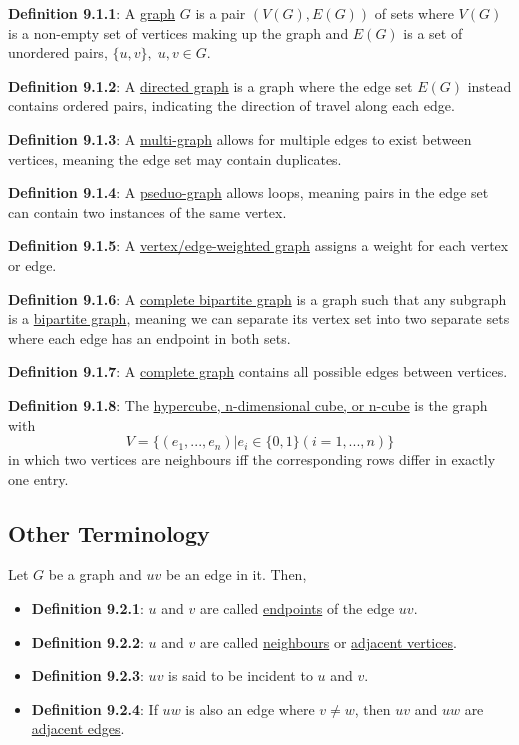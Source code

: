 \documentclass{article}
\newcommand{\separate}[1] {\vspace{#1 pt}\noindent}
\newcommand{\definition}[2]{\textbf{Definition #1}: #2\label{def:#1}}
\begin{document}
\definition{9.1.1}{A \underline{graph} \(G\) is a pair \((V(G), E(G))\) of sets where \(V(G)\) is a non-empty set of vertices making up the graph and \(E(G)\) is a set of unordered pairs, \(\{u,v\}, \;u,v\in G\).}

\separate{5}\definition{9.1.2}{A \underline{directed graph} is a graph where the edge set \(E(G)\) instead contains ordered pairs, indicating the direction of travel along each edge.}

\separate{5}\definition{9.1.3}{A \underline{multi-graph} allows for multiple edges to exist between vertices, meaning the edge set may contain duplicates.}

\separate{5}\definition{9.1.4}{A \underline{pseduo-graph} allows loops, meaning pairs in the edge set can contain two instances of the same vertex.}

\separate{5}\definition{9.1.5}{A \underline{vertex/edge-weighted graph} assigns a weight for each vertex or edge.}

\separate{5}\definition{9.1.6}{A \underline{complete bipartite graph} is a graph such that any subgraph is a \underline{bipartite graph}, meaning we can separate its vertex set into two separate sets where each edge has an endpoint in both sets.}

\separate{5}\definition{9.1.7}{A \underline{complete graph} contains all possible edges between vertices.}

\separate{5}\definition{9.1.8}{The \underline{hypercube, n-dimensional cube, or n-cube} is the graph with
\begin{equation}
    V = \{(e_1,...,e_n) | e_i \in \{0,1\} (i=1,...,n)\}
\end{equation}
in which two vertices are neighbours iff the corresponding rows differ in exactly one entry.}

\subsection{Other Terminology}

Let \(G\) be a graph and \(uv\) be an edge in it. Then,
\begin{itemize}
    \item \definition{9.2.1}{\(u\) and \(v\) are called \underline{endpoints} of the edge \(uv\).}
    \item \definition{9.2.2}{\(u\) and \(v\) are called \underline{neighbours} or \underline{adjacent vertices}.}
    \item \definition{9.2.3}{\(uv\) is said to be incident to \(u\) and \(v\).}
    \item \definition{9.2.4}{If \(uw\) is also an edge where \(v\neq w\), then \(uv\) and \(uw\) are \underline{adjacent edges}.}
\end{itemize}
\end{document}
